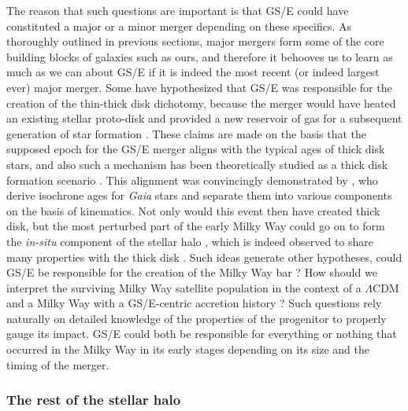 The reason that such questions are important is that GS/E could have constituted a major or a minor merger depending on these specifics. As thoroughly outlined in previous sections, major mergers form some of the core building blocks of galaxies such as ours, and therefore it behooves us to learn as much as we can about GS/E if it is indeed the most recent (or indeed largest ever) major merger. Some have hypothesized that GS/E was responsible for the creation of the thin-thick disk dichotomy, because the merger would have heated an existing stellar proto-disk and provided a new reservoir of gas for a subsequent generation of star formation \parencite{helmi18,gallart19}. These claims are made on the basis that the supposed epoch for the GS/E merger aligns with the typical ages of thick disk stars, and also such a mechanism has been theoretically studied as a thick disk formation scenario \parencite[e.g.][]{quinn93,purcell10}. This alignment was convincingly demonstrated by \textcite{gallart19}, who derive isochrone ages for \textit{Gaia} stars and separate them into various components on the basis of kinematics. Not only would this event then have created thick disk, but the most perturbed part of the early Milky Way could go on to form the \textit{in-situ} component of the stellar halo \parencite{haywood18,dimatteo19,belokurov20}, which is indeed observed to share many properties with the thick disk \parencite{nissen10}. Such ideas generate other hypotheses, could GS/E be responsible for the creation of the Milky Way bar \parencite[e.g.][]{fragkoudi20}? How should we interpret the surviving Milky Way satellite population in the context of a $\Lambda$CDM and a Milky Way with a GS/E-centric accretion history \parencite{bose20}? Such questions rely naturally on detailed knowledge of the properties of the progenitor to properly gauge its impact. GS/E could both be responsible for everything or nothing that occurred in the Milky Way in its early stages depending on its size and the timing of the merger.

\subsubsection{The rest of the stellar halo}

